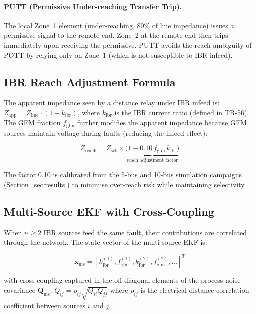 \documentclass[11pt, a4paper]{article}
\newcommand{\kibr}{k_{\mathrm{ibr}}}
\newcommand{\fgfm}{f_{\mathrm{gfm}}}
\begin{document}
\paragraph{PUTT (Permissive Under-reaching Transfer Trip).}
The local Zone~1 element (under-reaching, 80\% of line impedance) issues a
permissive signal to the remote end. Zone~2 at the remote end then trips
immediately upon receiving the permissive. PUTT avoids the reach ambiguity
of POTT by relying only on Zone~1 (which is not susceptible to IBR infeed).

\subsection{IBR Reach Adjustment Formula}

The apparent impedance seen by a distance relay under IBR infeed is:
$Z_{\mathrm{app}} = Z_{\mathrm{line}} \cdot (1 + \kibr)$,
where $\kibr$ is the IBR current ratio (defined in TR-56).
The GFM fraction $\fgfm$ further modifies the apparent impedance because
GFM sources maintain voltage during faults (reducing the infeed effect):

\begin{equation}
  Z_{\mathrm{reach}} = Z_{\mathrm{set}} \times
    \underbrace{\bigl(1 - 0.10\,\fgfm\,\kibr\bigr)}_{\text{reach adjustment factor}}
  \label{eq:reach_adjust}
\end{equation}

The factor 0.10 is calibrated from the 5-bus and 10-bus simulation campaigns
(Section~\ref{sec:results}) to minimise over-reach risk while maintaining
selectivity.

\subsection{Multi-Source EKF with Cross-Coupling}

When $n \geq 2$ IBR sources feed the same fault, their contributions are
correlated through the network. The state vector of the multi-source EKF is:

\begin{equation}
  \mathbf{x}_{\mathrm{ms}} =
    [\kibr^{(1)}, \fgfm^{(1)}, \kibr^{(2)}, \fgfm^{(2)}, \ldots]^T
\end{equation}

\noindent with cross-coupling captured in the off-diagonal elements of the
process noise covariance $\mathbf{Q}_{\mathrm{ms}}$:
$Q_{ij} = \rho_{ij}\sqrt{Q_{ii}Q_{jj}}$ where $\rho_{ij}$ is the electrical
distance correlation coefficient between sources $i$ and $j$.
\end{document}
